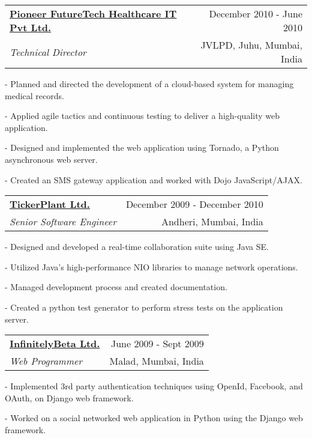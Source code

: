 \documentclass[12pt]{article}
\makeatletter
\newcommand{\employer}[4]{ 
        \vspace*{6pt}
	\begin{tabular*}{\textwidth}{l@{\extracolsep{\fill}}r}
	\textbf{#1} & #2 \\
                #3  & #4 \\ 
	\end{tabular*}
}
\newenvironment{achievements}{
        \vspace{-0pt}
        \begin{list}
        {}
        {\topsep 0pt \itemsep -3pt}
}
{
        \end{list}
}
\makeatother
\begin{document}
\employer{\href{http://www.pfhit.com/}{Pioneer FutureTech Healthcare IT Pvt Ltd.}}{December 2010 - June 2010}{\emph{Technical Director}} {JVLPD, Juhu, Mumbai, India}
	\begin{achievements}
        \item[-] Planned and directed the development of a cloud-based system for managing medical records.
        \item[-] Applied agile tactics and continuous testing to deliver a high-quality web application.
        \item[-] Designed and implemented the web application using Tornado, a Python asynchronous web server.
        \item[-] Created an SMS gateway application and worked with Dojo JavaScript/AJAX.
	\end{achievements}

\employer{\href{http://www.Tickerplantindia.com/}{TickerPlant Ltd.}}{December 2009 - December 2010}{\emph{Senior Software Engineer}} {Andheri, Mumbai, India}
	\begin{achievements}
        \item[-] Designed and developed a real-time collaboration suite using Java SE.
        \item[-] Utilized Java's high-performance NIO libraries to manage network operations.
        \item[-] Managed development process and created documentation.
        \item[-] Created a python test generator to perform stress tests on the application server.
	\end{achievements}
\vspace{5pt}
\employer{\href{http://www.InfinitelyBeta.com/}{InfinitelyBeta Ltd.}}{June 2009 - Sept 2009}{\emph{Web Programmer}} {Malad, Mumbai, India}
	\begin{achievements}
        \item[-] Implemented 3rd party authentication techniques using OpenId, Facebook, and OAuth, on Django web framework.
        \item[-] Worked on a social networked web application in Python using the Django web framework.
	\end{achievements}
\end{document}
